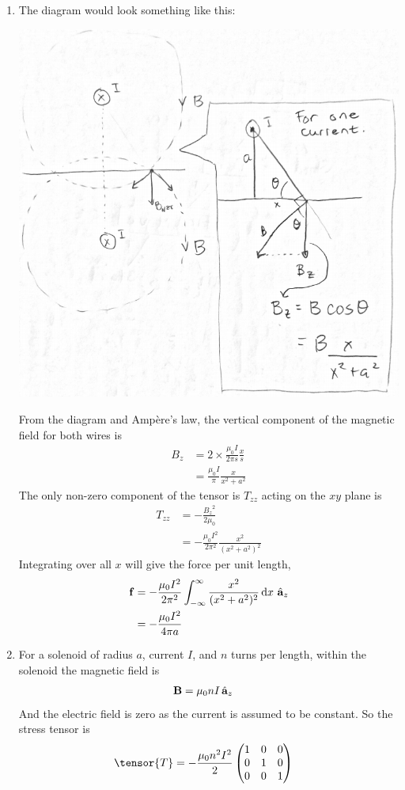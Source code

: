 \documentclass{homework}
\begin{document}
\begin{enumerate}
		\item The diagram would look something like this: 
		
		\includegraphics[width=0.7\linewidth]{hw3_diagram}
		
		From the diagram and Amp\`ere's law, the vertical component of the magnetic field for both wires is \begin{align*}
			B_z & = 2 \times \frac{\mu_0 I }{2 \pi s} \frac{x}{s} \\
				& = \frac{\mu_0 I}{\pi} \frac{x}{x^2 + a^2}
		\end{align*}
		The only non-zero component of the tensor is $T_{zz}$ acting on the $xy$ plane is \begin{align*}
			T_{zz} & = -\frac{{B_z}^2}{2 \mu_0} \\
				& = - \frac{\mu_0 I^2}{2 \pi^2} \frac{x^2}{(x^2 + a^2)^2}
		\end{align*}
		Integrating over all $x$ will give the force per unit length, \begin{align*}
			\boldsymbol{\mathrm{f}} & = - \frac{\mu_0 I^2}{2 \pi^2} \int_{-\infty}^\infty \frac{x^2}{(x^2 + a^2)^2} \dd{x} \thinspace\hat{ \mathbf{a}}_{z} \\
				& =  - \frac{\mu_0 I^2}{4 \pi a}
		\end{align*}
		\item For a solenoid of radius $a$, current $I$, and $n$ turns per length, within the solenoid the magnetic field is \begin{align*}
			\boldsymbol{\mathrm{B}} & = \mu_0 n I \thinspace\hat{ \mathbf{a}}_{z}
		\end{align*}
		And the electric field is zero as the current is assumed to be constant. So the stress tensor is \begin{align*}
			\tensor{T} & = -\frac{\mu_0 n^2 I^2}{2}  \begin{pmatrix}
				1 & 0 & 0 \\
				0 & 1 & 0 \\
				0 & 0 & 1
			\end{pmatrix}
		\end{align*}
	

\end{enumerate}
\end{document}
